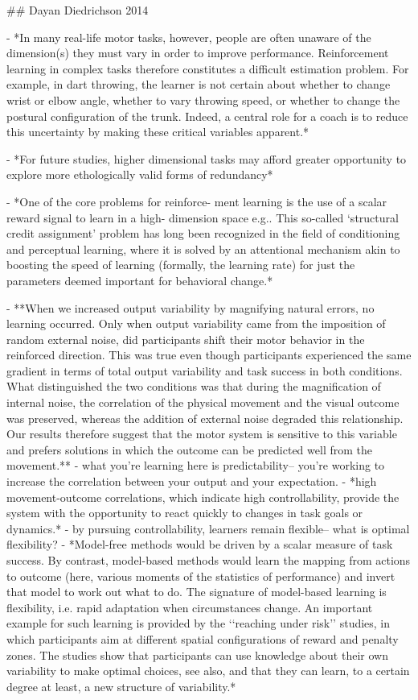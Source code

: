 \documentclass[../main.tex]{subfiles}
\begin{document}
{{## Dayan Diedrichson 2014

- *In many real-life motor tasks, however, people are often unaware of the dimension(s) they must vary in order to improve performance. Reinforcement learning in complex tasks therefore constitutes a difficult estimation problem. For example, in dart throwing, the learner is not certain about whether to change wrist or elbow angle, whether to vary throwing speed, or whether to change the postural configuration of the trunk. Indeed, a central role for a coach is to reduce this uncertainty by making these critical variables apparent.*

- *For future studies, higher dimensional tasks may afford greater opportunity to explore more ethologically valid forms of redundancy*

- *One of the core problems for reinforce- ment learning is the use of a scalar reward signal to learn in a high- dimension space e.g.. This so-called ‘structural credit assignment’ problem has long been recognized in the field of conditioning and perceptual learning, where it is solved by an attentional mechanism akin to boosting the speed of learning (formally, the learning rate) for just the parameters deemed important for behavioral change.*

- **When we increased output variability by magnifying natural errors, no learning occurred. Only when output variability came from the imposition of random external noise, did participants shift their motor behavior in the reinforced direction. This was true even though participants experienced the same gradient in terms of total output variability and task success in both conditions. What distinguished the two conditions was that during the magnification of internal noise, the correlation of the physical movement and the visual outcome was preserved, whereas the addition of external noise degraded this relationship. Our results therefore suggest that the motor system is sensitive to this variable and prefers solutions in which the outcome can be predicted well from the movement.**
	- what you're learning here is predictability-- you're working to increase the correlation between your output and your expectation.
- *high movement-outcome correlations, which indicate high controllability, provide the system with the opportunity to react quickly to changes in task goals or dynamics.*
	- by pursuing controllability, learners remain flexible-- what is optimal flexibility?
- *Model-free methods would be driven by a scalar measure of task success. By contrast, model-based methods would learn the mapping from actions to outcome (here, various moments of the statistics of performance) and invert that model to work out what to do. The signature of model-based learning is flexibility, i.e. rapid adaptation when circumstances change. An important example for such learning is provided by the ‘‘reaching under risk’’ studies, in which participants aim at different spatial configurations of reward and penalty zones. The studies show that participants can use knowledge about their own variability to make optimal choices, see also, and that they can learn, to a certain degree at least, a new structure of variability.*

}}
\end{document}
